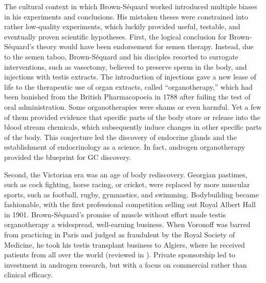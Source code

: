 \documentclass[12pt,english]{report}\usepackage[]{graphicx}\usepackage[]{color}
\begin{document}
The cultural context in which Brown-Séquard worked introduced multiple
biases in his experiments and conclusions. His mistaken theses were
constrained into rather low-quality experiments, which luckily provided
useful, testable, and eventually proven scientific hypotheses. First,
the logical conclusion for Brown-Séquard's theory would have been
endorsement for semen therapy. Instead, due to the semen taboo, Brown-Séquard
and his disciples resorted to surrogate interventions, such as vasectomy,
believed to preserve sperm in the body, and injections with testis
extracts. The introduction of injections gave a new lease of life
to the therapeutic use of organ extracts, called ``organotherapy,''
which had been banished from the British Pharmacopoeia in 1788 after
failing the test of oral administration. Some organotherapies were
shams or even harmful. Yet a few of them provided evidence that specific
parts of the body store or release into the blood stream chemicals,
which subsequently induce changes in other specific parts of the body.
This conjecture led the discovery of endocrine glands and the establishment
of endocrinology as a science. In fact, androgen organotherapy provided
the blueprint for GC discovery.

Second, the Victorian era was an age of body rediscovery. Georgian
pastimes, such as cock fighting, horse racing, or cricket, were replaced
by more muscular sports, such as football, rugby, gymnastics, and
swimming. Bodybuilding became fashionable, with the first professional
competition selling out Royal Albert Hall in 1901. Brown-Séquard's
promise of muscle without effort made testis organotherapy a widespread,
well-earning business. When Voronoff was barred from practicing in
Paris and judged as fraudulent by the Royal Society of Medicine, he
took his testis transplant business to Algiers, where he received
patients from all over the world (reviewed in \citep{nieschlag2014testosterone}).
Private sponsorship led to investment in androgen research, but with
a focus on commercial rather than clinical efficacy.
\end{document}
